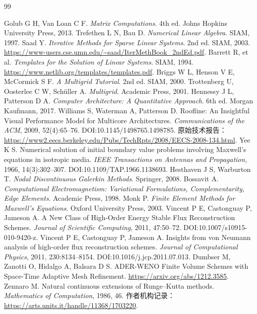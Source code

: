 \begin{thebibliography}{99}
 Golub G H, Van Loan C F. \emph{Matrix Computations}. 4th ed. Johns Hopkins University Press, 2013.
 Trefethen L N, Bau D. \emph{Numerical Linear Algebra}. SIAM, 1997.
 Saad Y. \emph{Iterative Methods for Sparse Linear Systems}. 2nd ed. SIAM, 2003. \url{https://www-users.cse.umn.edu/~saad/IterMethBook_2ndEd.pdf}.
 Barrett R, et al. \emph{Templates for the Solution of Linear Systems}. SIAM, 1994. \url{https://www.netlib.org/templates/templates.pdf}.
 Briggs W L, Henson V E, McCormick S F. \emph{A Multigrid Tutorial}. 2nd ed. SIAM, 2000.
 Trottenberg U, Oosterlee C W, Schüller A. \emph{Multigrid}. Academic Press, 2001.
 Hennessy J L, Patterson D A. \emph{Computer Architecture: A Quantitative Approach}. 6th ed. Morgan Kaufmann, 2017.
 Williams S, Waterman A, Patterson D. Roofline: An Insightful Visual Performance Model for Multicore Architectures. \emph{Communications of the ACM}, 2009, 52(4):65--76. DOI:10.1145/1498765.1498785. 原始技术报告：\url{https://www2.eecs.berkeley.edu/Pubs/TechRpts/2008/EECS-2008-134.html}.
 Yee K S. Numerical solution of initial boundary value problems involving Maxwell's equations in isotropic media. \emph{IEEE Transactions on Antennas and Propagation}, 1966, 14(3):302--307. DOI:10.1109/TAP.1966.1138693.
 Hesthaven J S, Warburton T. \emph{Nodal Discontinuous Galerkin Methods}. Springer, 2008.
 Bossavit A. \emph{Computational Electromagnetism: Variational Formulations, Complementarity, Edge Elements}. Academic Press, 1998.
 Monk P. \emph{Finite Element Methods for Maxwell's Equations}. Oxford University Press, 2003.
 Vincent P E, Castonguay P, Jameson A. A New Class of High-Order Energy Stable Flux Reconstruction Schemes. \emph{Journal of Scientific Computing}, 2011, 47:50--72. DOI:10.1007/s10915-010-9420-z.
 Vincent P E, Castonguay P, Jameson A. Insights from von Neumann analysis of high-order flux reconstruction schemes. \emph{Journal of Computational Physics}, 2011, 230:8134--8154. DOI:10.1016/j.jcp.2011.07.013.
 Dumbser M, Zanotti O, Hidalgo A, Balsara D S. ADER-WENO Finite Volume Schemes with Space-Time Adaptive Mesh Refinement. \url{https://arxiv.org/abs/1212.3585}.
 Zennaro M. Natural continuous extensions of Runge--Kutta methods. \emph{Mathematics of Computation}, 1986, 46. 作者机构记录：\url{https://arts.units.it/handle/11368/1703220}.

\end{thebibliography}
